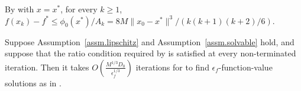 \documentclass[moor,sglanonrev]{informs4}
\begin{document}
{\color{red}
By  with $x=x^*$, for every $k\ge1$, $f(x_k)-f^*\le \phi_0(x^*)/A_k=8M\|x_0-x^*\|^3/(k(k+1)(k+2)/6).$
\Halmos \endproof
\begin{corollary}
    \label{coro.function value complexity}
    Suppose Assumption~\ref{assm.lipschitz} and Assumption~\ref{assm.solvable}
    hold, and suppose that the ratio condition required by
     is satisfied at every non-terminated
    iteration. Then it takes $O\left(\frac{M^{1/3}D_0}{\epsilon_f^{1/3}}\right)$ iterations for  to find $\epsilon_f$-function-value solutions as in .
\end{corollary}
}

\end{document}
